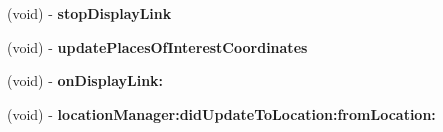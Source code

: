 \begin{DoxyCompactItemize}
\item 
\hypertarget{category_a_r_view_07_08_ab3702f7abe68af4f6bb38b2700f3f2d9}{(void) -\/ {\bfseries stop\-Display\-Link}}\label{category_a_r_view_07_08_ab3702f7abe68af4f6bb38b2700f3f2d9}

\item 
\hypertarget{category_a_r_view_07_08_ab95298fb5a99d46fba2379b59483db11}{(void) -\/ {\bfseries update\-Places\-Of\-Interest\-Coordinates}}\label{category_a_r_view_07_08_ab95298fb5a99d46fba2379b59483db11}

\item 
\hypertarget{category_a_r_view_07_08_a5576980c1bcd659a2201820383e6498f}{(void) -\/ {\bfseries on\-Display\-Link\-:}}\label{category_a_r_view_07_08_a5576980c1bcd659a2201820383e6498f}

\item 
\hypertarget{category_a_r_view_07_08_a97032b847f0e0683c80ade420a799470}{(void) -\/ {\bfseries location\-Manager\-:did\-Update\-To\-Location\-:from\-Location\-:}}\label{category_a_r_view_07_08_a97032b847f0e0683c80ade420a799470}

\end{DoxyCompactItemize}

